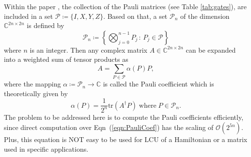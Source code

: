 Within the paper \cite{Georges_2025}, the collection of the Pauli matrices (see Table \ref{tab:gates}), are included in a set $\mathscr{P} \coloneqq \{I, X, Y, Z\}$. Based on that, a set  $\mathscr{P}_n$ of the dimension  $\mathbb{C}^{2n\times2n}$ is defined by
\begin{equation}
    \mathscr{P}_n \coloneqq \left\{\bigotimes_{j=0}^{n-1}P_j\,:\,P_j\in\mathscr{P}\right\}
\end{equation}
where $n$ is an integer. Then any complex matrix $A\in\mathbb{C}^{2n\times2n}$ can be expanded into a weighted sum of tensor products as
\begin{equation}
A=\sum_{P\in\mathscr{P}}\alpha(P)P,
\end{equation}
where the mapping $\alpha\coloneqq\mathscr{P}_n\rightarrow\mathbb{C}$ is called the Pauli coefficient which is theoretically given by
\begin{equation}
    \alpha(P)=\frac{1}{2^n}\text{tr}(A^\dagger P) \;\text{where}\; P\in\mathscr{P}_n.
    \label{eqn:PauliCoef}
\end{equation}
The problem to be addressed here is to compute the Pauli coefficients efficiently, since direct computation over Eqn~(\ref{eqn:PauliCoef}) has the scaling of  $\mathcal{O}(2^{5n})$. Plus, this equation is NOT easy to be used for LCU of a Hamiltonian or a matrix used in specific applications.

